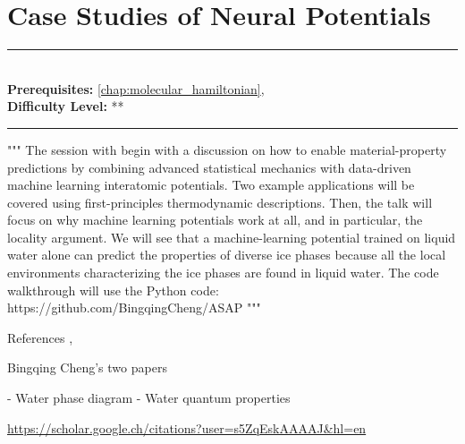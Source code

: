 \documentclass[book.tex]{subfiles}
\begin{document}
\chapter{Case Studies of Neural Potentials}

\label{chap:case_studies}
\noindent\rule{11cm}{0.4pt} \\
\textbf{Prerequisites:}  \autoref{chap:molecular_hamiltonian},   \\
\textbf{Difficulty Level:} ** \\
\noindent\rule{11cm}{0.4pt}
\vspace{5mm}

"""
The session with begin with a discussion on how to enable material-property predictions by combining advanced statistical mechanics with data-driven machine learning interatomic potentials. Two example applications will be covered using first-principles thermodynamic descriptions. Then, the talk will focus on why machine learning potentials work at all, and in particular, the locality argument. We will see that a machine-learning potential trained on liquid water alone can predict the properties of diverse ice phases because all the local environments characterizing the ice phases are found in liquid water.
The code walkthrough will use the Python code: https://github.com/BingqingCheng/ASAP
"""

References \cite{cheng2019ab}, \cite{cheng2020evidence}

Bingqing Cheng's two papers

- Water phase diagram
- Water quantum properties

\url{https://scholar.google.ch/citations?user=s5ZqEskAAAAJ&hl=en} 
\end{document}
